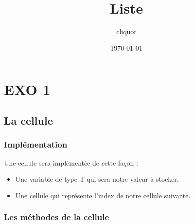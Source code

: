 \documentclass[11pt]{article}
\author{cliquot}
\date{\today}
\title{Liste}
\begin{document}
\maketitle
\tableofcontents


\section{EXO 1}
\label{sec:orga3efe15}

\subsection{La cellule}
\label{sec:org3c51dcb}

\subsubsection{Implémentation}
\label{sec:org5f2e90d}

Une cellule sera implémentée de cette façon :
\begin{itemize}
\item Une variable de type T qui sera notre valeur à stocker.
\item Une cellule qui représente l'index de notre cellule suivante.
\end{itemize}

\subsubsection{Les méthodes de la cellule}
\label{sec:org9fd8042}
\end{document}
